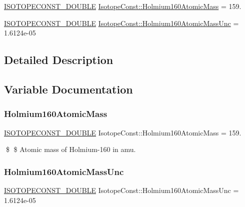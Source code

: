 \begin{DoxyCompactItemize}
\item 
\mbox{\hyperlink{group___isotope_const-_macros_ga8f45a7272ce02c0b4c65c44636ed719a}{I\+S\+O\+T\+O\+P\+E\+C\+O\+N\+S\+T\+\_\+\+D\+O\+U\+B\+LE}} \mbox{\hyperlink{group___isotope_const-_holmium-_ho160_gab905228bf27293151eac1370449cb2ff}{Isotope\+Const\+::\+Holmium160\+Atomic\+Mass}} = 159.
\item 
\mbox{\hyperlink{group___isotope_const-_macros_ga8f45a7272ce02c0b4c65c44636ed719a}{I\+S\+O\+T\+O\+P\+E\+C\+O\+N\+S\+T\+\_\+\+D\+O\+U\+B\+LE}} \mbox{\hyperlink{group___isotope_const-_holmium-_ho160_ga5e9bbd2c6364a20fda7130babfb02a3d}{Isotope\+Const\+::\+Holmium160\+Atomic\+Mass\+Unc}} = 1.\+6124e-\/05
\end{DoxyCompactItemize}


\subsection{Detailed Description}


\subsection{Variable Documentation}
\mbox{\label{group___isotope_const-_holmium-_ho160_gab905228bf27293151eac1370449cb2ff}} 
\subsubsection{\texorpdfstring{Holmium160\+Atomic\+Mass}{Holmium160AtomicMass}}
{\footnotesize\ttfamily \mbox{\hyperlink{group___isotope_const-_macros_ga8f45a7272ce02c0b4c65c44636ed719a}{I\+S\+O\+T\+O\+P\+E\+C\+O\+N\+S\+T\+\_\+\+D\+O\+U\+B\+LE}} Isotope\+Const\+::\+Holmium160\+Atomic\+Mass = 159.}

\$ \$ Atomic mass of Holmium-\/160 in amu. \mbox{\label{group___isotope_const-_holmium-_ho160_ga5e9bbd2c6364a20fda7130babfb02a3d}} 
\subsubsection{\texorpdfstring{Holmium160\+Atomic\+Mass\+Unc}{Holmium160AtomicMassUnc}}
{\footnotesize\ttfamily \mbox{\hyperlink{group___isotope_const-_macros_ga8f45a7272ce02c0b4c65c44636ed719a}{I\+S\+O\+T\+O\+P\+E\+C\+O\+N\+S\+T\+\_\+\+D\+O\+U\+B\+LE}} Isotope\+Const\+::\+Holmium160\+Atomic\+Mass\+Unc = 1.\+6124e-\/05}

